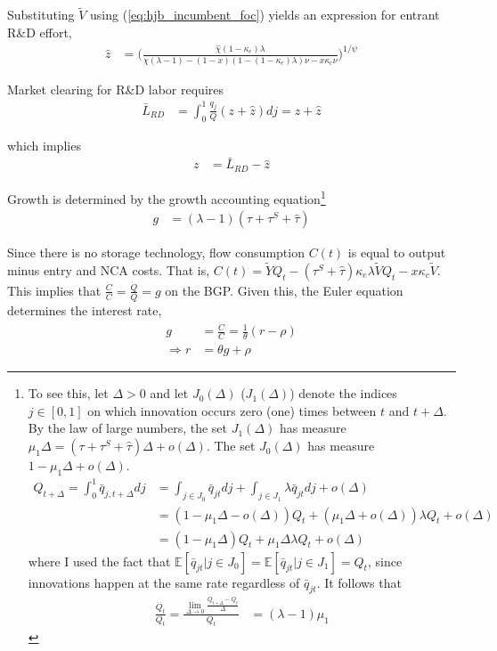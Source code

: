 \documentclass[11pt,english]{article}
\begin{document}
Substituting $\tilde{V}$ using (\ref{eq:hjb_incumbent_foc}) yields an expression for entrant R\&D effort, 
\begin{align}
	\hat{z} &= \Big( \frac{\hat{\chi} (1-\kappa_{e}) \lambda}{\chi(\lambda-1) - (1-x) (1- (1-\kappa_e)\lambda)\nu - x \kappa_{c} \nu} \Big)^{1/\psi} \label{eq:effort_entrant}
\end{align}

Market clearing for R\&D labor requires
\begin{align}
	\bar{L}_{RD} &= \int_0^1 \frac{q_j}{Q} (z + \hat{z}) dj = z + \hat{z}
\end{align}
 
which implies
\begin{align}
	z &= \bar{L}_{RD} - \hat{z} \label{eq:zI_asFuncZe}
\end{align}

Growth is determined by the growth accounting equation\footnote{To see this, let $\Delta > 0$ and let $J_0(\Delta)$ ($J_1(\Delta)$) denote the indices $j\in [0,1]$ on which innovation occurs zero (one) times between $t$ and $t+\Delta$. By the law of large numbers, the set $J_1(\Delta)$ has measure $\mu_1 \Delta = (\tau + \tau^S + \hat{\tau})\Delta + o(\Delta)$. The set $J_0(\Delta)$ has measure $1 - \mu_1 \Delta + o(\Delta)$. 
		\begin{align*}
			Q_{t+\Delta} = \int_0^1 \bar{q}_{j,t+\Delta} dj &= \int_{j \in J_0} \bar{q}_{jt} dj + \int_{j \in J_1} \lambda \bar{q}_{jt} dj + o(\Delta) \\
			&= (1 - \mu_1\Delta - o(\Delta)) Q_t + (\mu_1 \Delta + o(\Delta) ) \lambda Q_t + o(\Delta) \\
			&= (1 - \mu_1\Delta) Q_t + \mu_1\Delta \lambda Q_t + o(\Delta)
 	\end{align*}
 where I used the fact that $\mathbb{E}[\bar{q}_{jt} | j \in J_0]  = \mathbb{E}[\bar{q}_{jt} | j \in J_1] = Q_t$, since innovations happen at the same rate regardless of $\bar{q}_{jt}$. It follows that
\begin{align*}
	\frac{\dot{Q}_t}{Q_t} = \frac{\lim_{\Delta \to 0} \frac{Q_{t+\Delta} - Q_t}{\Delta}}{Q_t} &= (\lambda - 1)\mu_1 
	\end{align*}}
\begin{align}
g &= (\lambda - 1)(\tau + \tau^S + \hat{\tau}) \label{eq:growth_accounting}
\end{align}

Since there is no storage technology, flow consumption $C(t)$ is equal to output minus entry and NCA costs. That is, $C(t) = \tilde{Y}Q_t - (\tau^S + \hat{\tau}) \kappa_e \lambda \tilde{V} Q_t - x \kappa_c \tilde{V}$. This implies that $\frac{\dot{C}}{C} = \frac{\dot{Q}}{Q} = g$ on the BGP. Given this, the Euler equation determines the interest rate, 
\begin{align}
	g &= \frac{\dot{C}}{C} = \frac{1}{\theta} (r - \rho) \label{eq:euler} \\
	\Rightarrow r &= \theta g + \rho \nonumber
\end{align}
\end{document}
